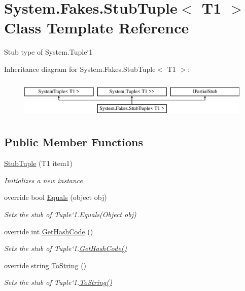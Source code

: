 \hypertarget{class_system_1_1_fakes_1_1_stub_tuple_3_01_t1_01_4}{\section{System.\-Fakes.\-Stub\-Tuple$<$ T1 $>$ Class Template Reference}
\label{class_system_1_1_fakes_1_1_stub_tuple_3_01_t1_01_4}
}


Stub type of System.\-Tuple`1 


Inheritance diagram for System.\-Fakes.\-Stub\-Tuple$<$ T1 $>$\-:\begin{figure}[H]
\begin{center}
\leavevmode
\includegraphics[height=1.904762cm]{class_system_1_1_fakes_1_1_stub_tuple_3_01_t1_01_4}
\end{center}
\end{figure}
\subsection*{Public Member Functions}
\begin{DoxyCompactItemize}
\item 
\hyperlink{class_system_1_1_fakes_1_1_stub_tuple_3_01_t1_01_4_a976fe10c250f2589f2fef356e82732f1}{Stub\-Tuple} (T1 item1)
\begin{DoxyCompactList}\small\item\em Initializes a new instance\end{DoxyCompactList}\item 
override bool \hyperlink{class_system_1_1_fakes_1_1_stub_tuple_3_01_t1_01_4_aaaaf3fb9c1ad55611a8d0d28af46f852}{Equals} (object obj)
\begin{DoxyCompactList}\small\item\em Sets the stub of Tuple`1.Equals(\-Object obj)\end{DoxyCompactList}\item 
override int \hyperlink{class_system_1_1_fakes_1_1_stub_tuple_3_01_t1_01_4_a2bb2ead87f42f54af7117f6c6b104f9d}{Get\-Hash\-Code} ()
\begin{DoxyCompactList}\small\item\em Sets the stub of Tuple`1.\hyperlink{class_system_1_1_fakes_1_1_stub_tuple_3_01_t1_01_4_a2bb2ead87f42f54af7117f6c6b104f9d}{Get\-Hash\-Code()}\end{DoxyCompactList}\item 
override string \hyperlink{class_system_1_1_fakes_1_1_stub_tuple_3_01_t1_01_4_a00eaa596b6eb16badf37e7d10974b60a}{To\-String} ()
\begin{DoxyCompactList}\small\item\em Sets the stub of Tuple`1.\hyperlink{class_system_1_1_fakes_1_1_stub_tuple_3_01_t1_01_4_a00eaa596b6eb16badf37e7d10974b60a}{To\-String()}\end{DoxyCompactList}\end{DoxyCompactItemize}
